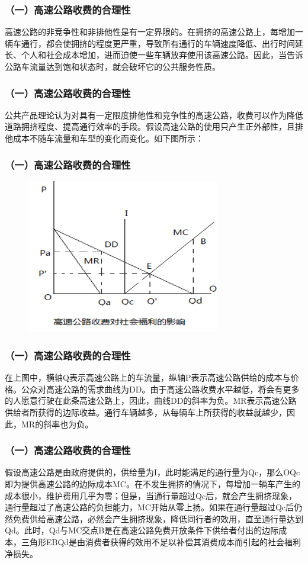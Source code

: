 \documentclass[aspectratio=169, 12pt]{beamer}
\begin{document}
\begin{frame}[plain]
    \frametitle{（一）高速公路收费的合理性}
    高速公路的非竞争性和非排他性是有一定界限的。在拥挤的高速公路上，每增加一辆车通行，都会使拥挤的程度更严重，导致所有通行的车辆速度降低、出行时间延长、个人和社会成本增加，进而迫使一些车辆放弃使用该高速公路。因此，当告诉公路车流量达到饱和状态时，就会破坏它的公共服务性质。
\end{frame}

\begin{frame}[plain]
    \frametitle{（一）高速公路收费的合理性}
    公共产品理论认为对具有一定限度排他性和竞争性的高速公路，收费可以作为降低道路拥挤程度、提高通行效率的手段。假设高速公路的使用只产生正外部性，且排他成本不随车流量和车型的变化而变化。如下图所示：
\end{frame}

\begin{frame}[plain]
    \frametitle{（一）高速公路收费的合理性}
    \begin{figure}
        \centering
            \includegraphics[width=0.75\textwidth]{./resources/figure/charge.png}
        \end{figure}
\end{frame}

\begin{frame}[plain]
    \frametitle{（一）高速公路收费的合理性}
    在上图中，横轴Q表示高速公路上的车流量，纵轴P表示高速公路供给的成本与价格。公众对高速公路的需求曲线为DD。由于高速公路收费水平越低，将会有更多的人愿意行驶在此条高速公路上，因此，曲线DD的斜率为负。MR表示高速公路供给者所获得的边际收益。通行车辆越多，从每辆车上所获得的收益就越少，因此，MR的斜率也为负。
\end{frame}

\begin{frame}[plain]
    \frametitle{（一）高速公路收费的合理性}
    假设高速公路是由政府提供的，供给量为I，此时能满足的通行量为Qc，那么OQc即为提供高速公路的边际成本MC。在不发生拥挤的情况下，每增加一辆车产生的成本很小，维护费用几乎为零；但是，当通行量超过Qc后，就会产生拥挤现象，通行量超过了高速公路的负担能力，MC开始从零上扬。如果在通行量超过Qc后仍然免费供给高速公路，必然会产生拥挤现象，降低同行者的效用，直至通行量达到Qd。此时，Qd与MC交点B是在高速公路免费开放条件下供给者付出的边际成本，三角形EBQd是由消费者获得的效用不足以补偿其消费成本而引起的社会福利净损失。
\end{frame}
\end{document}

